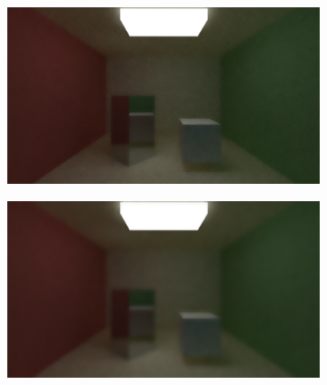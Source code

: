 \documentclass[titlepage,12pt]{report}
\begin{document}
\begin{figure}[H]
	\centering
	\begin{subfigure}{.48\textwidth}
		\centering
		\includegraphics[scale=0.2]{media/bilateral/cornell_normal_50_bilateral_filter_21_10_10.png}
		\label{bilateral_filter_17}
	\end{subfigure}
	\begin{subfigure}{.48\textwidth}
		\centering
		\includegraphics[scale=0.2]{media/bilateral/cornell_normal_50_bilateral_filter_21_10_20.png}
		\label{bilateral_filter_18}
	\end{subfigure}


\end{figure}
\end{document}
